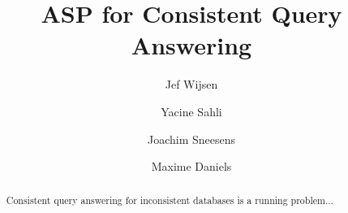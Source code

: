 \documentclass[acmsmall,anonymous,review]{acmart}
\begin{document}
\title{ASP for Consistent Query Answering}


\author{Jef Wijsen}

\author{Yacine Sahli}

\author{Joachim Sneesens}

\author{Maxime Daniels}

\renewcommand{\shortauthors}{Wijsen, Sahli, Sneesens and Daniels.}

\begin{abstract}
	Consistent query answering for inconsistent databases is a running problem...
\end{abstract}
\end{document}
